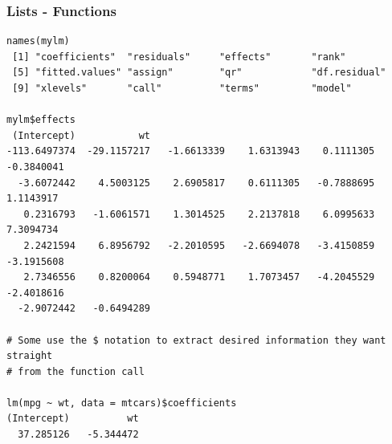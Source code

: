 \documentclass{beamer}
\begin{document}
%
\begin{frame}[fragile]
\frametitle{Lists - Functions}
\scriptsize
\begin{verbatim}
names(mylm)
 [1] "coefficients"  "residuals"     "effects"       "rank"         
 [5] "fitted.values" "assign"        "qr"            "df.residual"  
 [9] "xlevels"       "call"          "terms"         "model"  

mylm$effects
 (Intercept)           wt                                                     
-113.6497374  -29.1157217   -1.6613339    1.6313943    0.1111305   -0.3840041                                                                             
  -3.6072442    4.5003125    2.6905817    0.6111305   -0.7888695    1.1143917                                                                              
   0.2316793   -1.6061571    1.3014525    2.2137818    6.0995633    7.3094734                                                                               
   2.2421594    6.8956792   -2.2010595   -2.6694078   -3.4150859   -3.1915608                                                                               
   2.7346556    0.8200064    0.5948771    1.7073457   -4.2045529   -2.4018616                           
  -2.9072442   -0.6494289 

# Some use the $ notation to extract desired information they want straight 
# from the function call

lm(mpg ~ wt, data = mtcars)$coefficients
(Intercept)          wt 
  37.285126   -5.344472 

\end{verbatim}
\end{frame}
\end{document}
